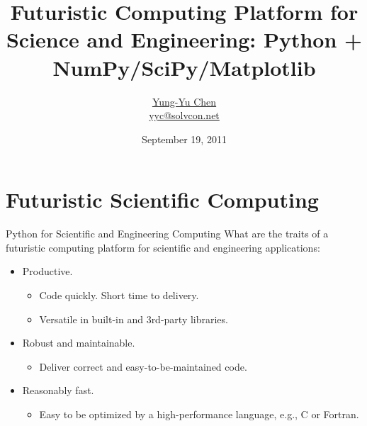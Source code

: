 \documentclass[dvips,xcolor=pst]{beamer}
\title[Futuristic Computing with Python]{Futuristic Computing Platform for
Science and Engineering: Python + NumPy/SciPy/Matplotlib}
\author[\href{http://solvcon.net/yyc/}{Chen}]%
{\href{http://solvcon.net/yyc/}{Yung-Yu Chen} \\ {\scriptsize
\url{yyc@solvcon.net}}}
\institute[\href{http://solvcon.net/}{SOLVCON}]%
{\href{http://solvcon.net/}{SOLVCON Project}}
\date[2011/9/19]{September 19, 2011}
\begin{document}
\begin{frame}
\titlepage
\end{frame}

\section{Futuristic Scientific Computing}

\begin{frame}{
%
Python for Scientific and Engineering Computing
%
} \large
What are the traits of a futuristic computing platform for scientific and
engineering applications:
\begin{itemize} \large
  \item Productive.
  \begin{itemize} \large
    \item Code quickly.  Short time to delivery.
    \item Versatile in built-in and 3rd-party libraries.
  \end{itemize}
  \item Robust and maintainable.
  \begin{itemize} \large
    \item Deliver correct and easy-to-be-maintained code.
  \end{itemize}
  \item Reasonably fast.
  \begin{itemize} \large
    \item Easy to be optimized by a high-performance language, e.g., C or
    Fortran.
  \end{itemize}
\end{itemize}
\end{frame}
\end{document}
